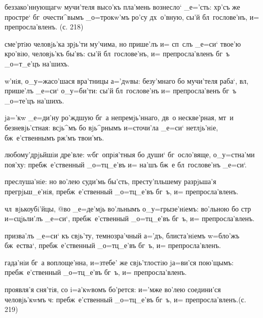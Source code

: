 
беззако'ннующагw мучи'теля высо'къ пла'мень вознесло` 
_е='сть: хр'съ же простре` бг~очести^вымъ _о=трокw'мъ 
ро'су дх~о'вную, сы'й бл~гослове'нъ, и= препросла'вленъ. 
(с. 218)

сме'ртiю человjь'ка зрjь'ти му'чима, но прише'лъ и= 
сп~слъ _е=си` твое'ю кро'вiю, человjь'къ бы'въ: сы'й 
бл~гослове'нъ, и= препросла'вленъ бг~ъ _о=т_е'цъ на'шихъ.

w'нiя, о_у=жасо'шася вра'тницы а='дwвы: безу'мнаго 
бо мучи'теля раба`, вл, прише'лъ _е=си` о_у=би'ти: 
сы'й бл~гослове'нъ и= препросла'венъ бг~ъ _о=те'цъ 
на'шихъ.

jа='кw _е=ди'ну ро'ждшую бг~а непремjь'ннаго, дв~о 
нескве'рная, мт~и безневjь'стная: всjь^мъ бо вjь^рнымъ 
и=сточи'ла _е=си` нетлjь'нiе, бж~е'ственнымъ рж'мъ 
твои'мъ.


любому'дрjьйшiи дре'вле: w\т бг~опрiя'тныя бо души` 
бг~осло'вяще, о_у=стна'ми поя'ху: пребж~е'ственный 
_о=тц_е'въ и= на'шъ бж~е бл~гослове'нъ _е=си`.

преслуша'нiе: но во'лею суди'мь бы'сть, престу'пльшему 
разрjьша'я прегрjьш_е'нiя, пребж~е'ственный _о=тц_е'въ 
бг~ъ, и= препросла'вленъ.

чл~вjькоубi'йцы, @во _е=де'мjь во'льнымъ о_у=грызе'нiемъ: 
во'льною бо стр и=сцjьли'лъ _е=си`, 
пребж~е'ственный _о=тц_е'въ бг~ъ, и= препросла'вленъ.

призва'лъ _е=си` къ свjь'ту, темнозра'чный а='дъ, 
блиста'нiемъ w=бло'жъ бж~ества`, пребж~е'ственный 
_о=тц_е'въ бг~ъ, и= препросла'вленъ.


гада'нiи бг~а воплоще'нна, и=з\ъ тебе' же свjь'тлостiю 
jа=ви'ся пою'щымъ: пребж~е'ственный _о=тц_е'въ бг~ъ, и= 
препросла'вленъ.

проявля'я сня'тiя, со i=а'кwвомъ бо'рется: и='мже во'лею 
соедини'ся человjь'кwмъ ч: пребж~е'ственный 
_о=тц_е'въ бг~ъ, и= препросла'вленъ.(с. 219)

